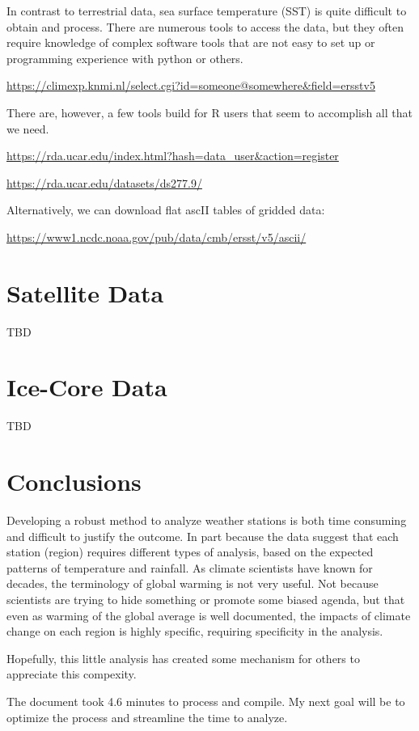 \documentclass{article}\usepackage[]{graphicx}\usepackage[]{color}
\makeatletter
\newenvironment{kframe}{%
 \def\at@end@of@kframe{}%
 \ifinner\ifhmode%
  \def\at@end@of@kframe{\end{minipage}}%
  \begin{minipage}{\columnwidth}%
 \fi\fi%
 \def\FrameCommand##1{\hskip\@totalleftmargin \hskip-\fboxsep
 \colorbox{shadecolor}{##1}\hskip-\fboxsep
     \hskip-\linewidth \hskip-\@totalleftmargin \hskip\columnwidth}%
 \MakeFramed {\advance\hsize-\width
   \@totalleftmargin\z@ \linewidth\hsize
   \@setminipage}}%
 {\par\unskip\endMakeFramed%
 \at@end@of@kframe}
\newenvironment{knitrout}{}{} %
\makeatother
\begin{document}
In contrast to terrestrial data, sea surface temperature (SST) is quite difficult to obtain and process. There are numerous tools to access the data, but they often require knowledge of complex software tools that are not easy to set up or programming experience with python or others.

\url{https://climexp.knmi.nl/select.cgi?id=someone@somewhere&field=ersstv5}

There are, however, a few tools build for R users that seem to accomplish all that we need. 

\url{https://rda.ucar.edu/index.html?hash=data_user&action=register}

\url{https://rda.ucar.edu/datasets/ds277.9/}

Alternatively, we can download flat ascII tables of gridded data:

\url{https://www1.ncdc.noaa.gov/pub/data/cmb/ersst/v5/ascii/}




\section{Satellite Data}

TBD

\section{Ice-Core Data}

TBD

\section{Conclusions}

Developing a robust method to analyze weather stations is both time consuming and difficult to justify the outcome. In part because the data suggest that each station (region) requires different types of analysis, based on the expected patterns of temperature and rainfall. As climate scientists have known for decades, the terminology of global warming is not very useful. Not because scientists are trying to hide something or promote some biased agenda, but that even as warming of the global average is well documented, the impacts of climate change on each region is highly specific, requiring specificity in the analysis. 

Hopefully, this little analysis has created some mechanism for others to appreciate this compexity. 

\begin{knitrout}
\color{fgcolor}\begin{kframe}


{\ttfamily\noindent\bfseries{}}\end{kframe}
\end{knitrout}

The document took 4.6 minutes to process and compile. My next goal will be to optimize the process and streamline the time to analyze. 
\end{document}
